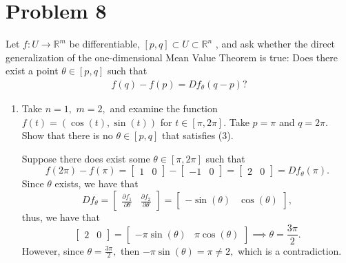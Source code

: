 \documentclass[11pt]{article}
\newcommand{\bbR}{\mathbb{R}}
\begin{document}
\section*{Problem 8}
\begin{problem}
     Let $f : U \to \bbR^m$ be differentiable, $[p,q] \subset U\subset \bbR^n$ , and ask whether the direct generalization of the one-dimensional Mean Value Theorem is true: Does there
 exist a point $\theta \in [p,q]$ such that
 \begin{align}
 f(q) - f(p) = Df_{\theta}(q-p)?    
 \end{align}
\end{problem}
\begin{enumerate}
    \item 
    \begin{problem}
         Take $n=1,$ $m=2,$ and examine the function $f(t) = (\cos(t), \sin(t))$ for $t \in [\pi, 2\pi].$ Take $p =\pi$ and $q = 2\pi.$ Show that there is no $\theta \in [p,q]$ that satisfies (3).
    \end{problem}
    \begin{solution}
       Suppose there does exist some $\theta \in [\pi, 2\pi]$ such that 
       \[f(2\pi) - f(\pi) = 
       \begin{bmatrix}
           1 & 0
       \end{bmatrix} - \begin{bmatrix}
           -1 & 0
       \end{bmatrix}
       = \begin{bmatrix}
           2 & 0
       \end{bmatrix}= Df_\theta(\pi).\] Since $\theta$ exists, we have that 
       \[Df_\theta = \begin{bmatrix}
           \frac{\partial f_1}{\partial \theta} & \frac{\partial f_2}{\partial \theta}
       \end{bmatrix} = \begin{bmatrix}
           -\sin(\theta) & \cos(\theta)
           \end{bmatrix},\] thus, we have that 
           \[
            \begin{bmatrix}
                2 & 0
            \end{bmatrix} = \begin{bmatrix}
                -\pi \sin(\theta) & \pi \cos(\theta)
            \end{bmatrix}
           \implies \theta = \frac{3\pi}{2}.
           \] However, since $\theta = \frac{3\pi}{2},$ then $-\pi\sin(\theta) = \pi \neq 2,$ which is a contradiction.

\end{solution}
\end{enumerate}
\end{document}
